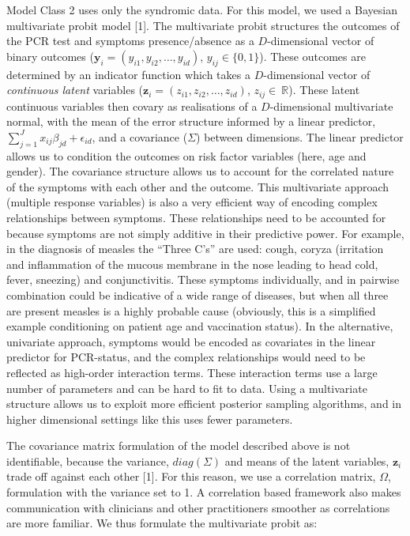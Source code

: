 \documentclass[]{elsarticle} %
\begin{document}
Model Class 2 uses only the syndromic data.
For this model, we used a Bayesian multivariate probit model {[}1{]}.
The multivariate probit structures the outcomes of the PCR test and symptoms presence/absence as a \(D\)-dimensional vector of binary outcomes (\(\boldsymbol{y}_i=(y_{i1},y_{i2},\dots,y_{id})\), \(y_{ij}\in\{0,1\}\)).
These outcomes are determined by an indicator function which takes a \(D\)-dimensional vector of \emph{continuous latent} variables (\(\boldsymbol{z}_i=(z_{i1},z_{i2},\dots,z_{id})\), \(z_{ij}\in\ \mathbb{R}\)).
These latent continuous variables then covary as realisations of a \(D\)-dimensional multivariate normal,
with the mean of the error structure informed by a linear predictor, \(\sum_{j=1}^J x_{ij}\beta_{jd} + \epsilon_{id}\), and a covariance (\(\Sigma\)) between dimensions.
The linear predictor allows us to condition the outcomes on risk factor variables (here, age and gender).
The covariance structure allows us to account for the correlated nature of the symptoms with each other and the outcome.
This multivariate approach (multiple response variables) is also a very efficient way of encoding complex relationships between symptoms.
These relationships need to be accounted for because symptoms are not simply additive in their predictive power.
For example, in the diagnosis of measles the ``Three C's'' are used: cough, coryza (irritation and inflammation of the mucous membrane in the nose leading to head cold, fever, sneezing) and conjunctivitis.
These symptoms individually, and in pairwise combination could be indicative of a wide range of diseases, but when all three are present measles is a highly probable cause (obviously, this is a simplified example conditioning on patient age and vaccination status).
In the alternative, univariate approach, symptoms would be encoded as covariates in the linear predictor for PCR-status, and the complex relationships would need to be reflected as high-order interaction terms.
These interaction terms use a large number of parameters and can be hard to fit to data.
Using a multivariate structure allows us to exploit more efficient posterior sampling algorithms, and in higher dimensional settings like this uses fewer parameters.

The covariance matrix formulation of the model described above is not identifiable, because the variance, \(diag (\Sigma)\) and means of the latent variables, \(\boldsymbol{z}_i\) trade off against each other {[}1{]}.
For this reason, we use a correlation matrix, \(\Omega\), formulation with the variance set to 1.
A correlation based framework also makes communication with clinicians and other practitioners smoother as correlations are more familiar.
We thus formulate the multivariate probit as:
\end{document}
